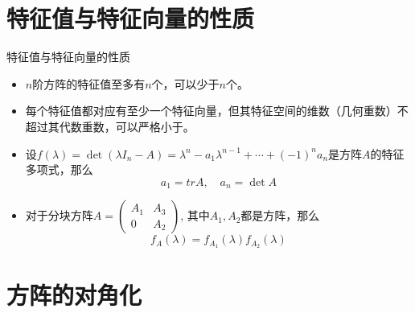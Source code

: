 
\section{特征值与特征向量的性质}


\begin{frame}

\begin{block}{特征值与特征向量的性质}
\begin{itemize}
\item<1-> $n$阶方阵的特征值至多有$n$个，可以少于$n$个。
\item<2-> 每个特征值都对应有至少一个特征向量，但其特征空间的维数（几何重数）不超过其代数重数，可以严格小于。
\item<3-> 设$f(\lambda) = \det(\lambda I_n - A) = \lambda^n - a_1\lambda^{n-1} + \cdots + (-1)^na_n$是方阵$A$的特征多项式，那么
\[a_1 = tr A, \quad a_n = \det A\]
\item<4-> 对于分块方阵\(\displaystyle A = \begin{pmatrix} A_1 & A_3 \\ 0 & A_2 \end{pmatrix}\), 其中$A_1,A_2$都是方阵，那么
\[f_A(\lambda) = f_{A_1}(\lambda)f_{A_2}(\lambda)\]
\end{itemize}
\end{block}

\end{frame}


\section{方阵的对角化}


